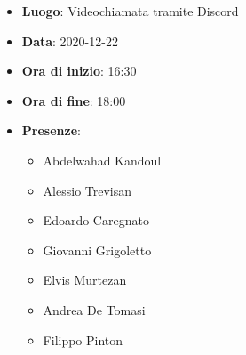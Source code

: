 \begin{itemize}
    \item \textbf{Luogo}: Videochiamata tramite Discord
    \item \textbf{Data}: 2020-12-22
    \item \textbf{Ora di inizio}: 16:30
    \item \textbf{Ora di fine}: 18:00
    \item \textbf{Presenze}:
          \begin{itemize}
            \item Abdelwahad Kandoul
            \item Alessio Trevisan
            \item Edoardo Caregnato
            \item Giovanni Grigoletto
            \item Elvis Murtezan
            \item Andrea De Tomasi
            \item Filippo Pinton
          \end{itemize}
\end{itemize}